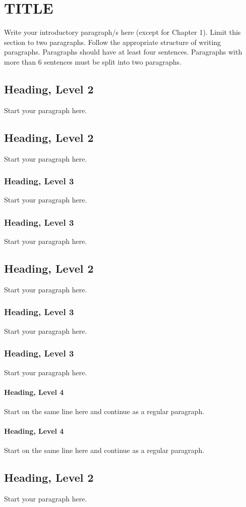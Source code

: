 \setlength{\parindent}{0.5in} 
\setlength{\parskip}{0mm}
\setlength{\baselineskip}{1.6em}

\chapter{TITLE}
Write your introductory paragraph/s here (except for Chapter 1). Limit this section to two paragraphs. Follow the appropriate structure of writing paragraphs. Paragraphs should have at least four sentences. Paragraphs with more than 6 sentences must be split into two paragraphs.

\section{Heading, Level 2}
Start your paragraph here.
\section{Heading, Level 2}
Start your paragraph here.
\subsection{Heading, Level 3}
Start your paragraph here.
\subsection{Heading, Level 3}
Start your paragraph here.
\section{Heading, Level 2}
Start your paragraph here.
\subsection{Heading, Level 3}
Start your paragraph here.
\subsection{Heading, Level 3}
Start your paragraph here.
\subsubsection{Heading, Level 4}
Start on the same line here and continue as a regular paragraph.
\subsubsection{Heading, Level 4}
Start on the same line here and continue as a regular paragraph.
\section{Heading, Level 2}
Start your paragraph here.